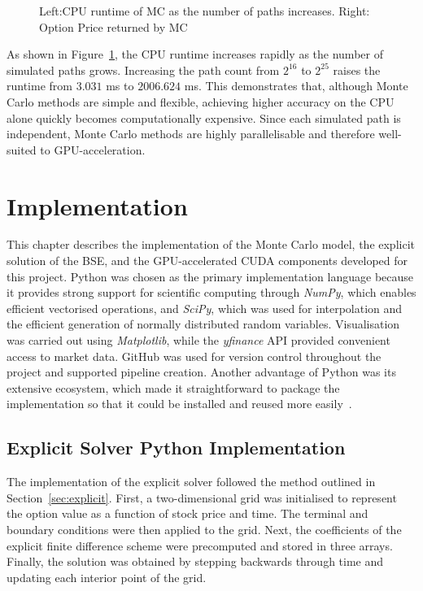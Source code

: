 \documentclass[11pt]{report}
\begin{document}
\begin{figure}[H]
  \centering
  \scalebox{0.85}{}
  \caption{Left:CPU runtime of MC as the number of paths increases. Right: Option Price returned by MC}
  \label{fig:MCcpuBenchmark}
\end{figure}

As shown in Figure~\ref{fig:MCcpuBenchmark}, the CPU runtime increases rapidly as the number of simulated paths grows. Increasing the path count from $2^{16}$ to $2^{25}$ raises the runtime from $3.031$ ms to $2006.624$ ms. 
This demonstrates that, although Monte Carlo methods are simple and flexible, achieving higher accuracy on the CPU alone quickly becomes computationally expensive. Since each simulated path is independent, Monte Carlo methods are highly parallelisable and therefore well-suited to GPU-acceleration.

\chapter{Implementation}\label{ch:imp}
This chapter describes the implementation of the Monte Carlo model,
the explicit solution of the BSE, 
and the GPU-accelerated CUDA components developed for this
project. Python was chosen as the primary implementation 
language because it provides strong support for scientific 
computing through \textit{NumPy}, which enables efficient 
vectorised operations, and \textit{SciPy}, which was used 
for interpolation and the efficient generation of normally
distributed random variables. 
Visualisation was carried out using \textit{Matplotlib}, 
while the \textit{yfinance} API provided convenient 
access to market data. GitHub was used for version control 
throughout the project and supported pipeline creation.
Another advantage of Python was its extensive ecosystem, 
which made it straightforward to package the implementation
so that it could be installed and reused more easily~\cite{bse40360770}.

\section{Explicit Solver Python Implementation}
The implementation of the explicit solver followed the method outlined in Section~\ref{sec:explicit}. 
First, a two-dimensional grid was initialised to represent the option value as a function of stock price and time. 
The terminal and boundary conditions were then applied to the grid. Next, the coefficients of the 
explicit finite difference scheme were precomputed and stored in three arrays. 
Finally, the solution was obtained by stepping backwards through time and updating each interior point of the grid.
\end{document}

